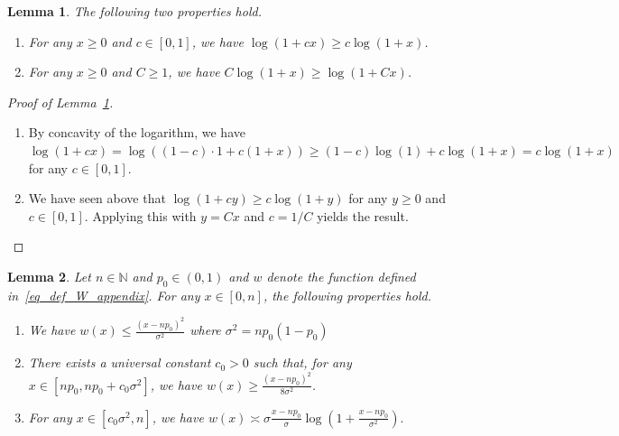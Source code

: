 \documentclass{article}
\newtheorem{lemma}{Lemma}
\begin{document}
\begin{lemma}\label{lem_logk_constants}
    The following two properties hold.
    \begin{enumerate}
        \item[(i)] For any $x \geq 0$ and $c \in [0,1]$, we have $\log(1+cx) \geq c\log(1+x)$.
        \item[(ii)] For any $x \geq 0$ and $C\geq 1$, we have $C\log(1+x) \geq \log(1+Cx)$.
    \end{enumerate}
\end{lemma}

\begin{proof}[Proof of Lemma~\ref{lem_logk_constants}]
\begin{enumerate}
    \item[(i)] By concavity of the logarithm, we have $\log(1+cx) = \log\left((1-c)\cdot 1 + c(1+x)\right) \geq (1-c) \log(1) + c\log(1+x) = c \log(1+x)$ for any $c \in [0,1]$. 
    \item[(ii)] We have seen above that $\log(1+cy) \geq c \log(1+y)$ for any $y \geq 0$ and $c \in [0,1]$. 
Applying this with $y = Cx$ and $c = 1/C$ yields the result. 
\end{enumerate}

    
\end{proof}


\begin{lemma}\label{lem_w_quadratic}
    Let $n\in \mathbb N$ and $p_0 \in (0,1)$ and $w$ denote the function defined in~\eqref{eq_def_W_appendix}. For any $x \in [0,n]$, the following properties hold.
    \begin{enumerate}
        \item We have $w(x) \leq \frac{(x-np_0)^2}{ \sigma^2}$ where $\sigma^2 = np_0(1-p_0)$
        \item There exists a universal constant $c_0>0$ such that, for any $x \in [np_0, np_0 + c_0\sigma^2]$, we have $w(x) \geq \frac{(x-np_0)^2}{8 \sigma^2}$.
        \item For any $x \in [c_0 \sigma^2, n]$, we have $w(x) \asymp \sigma \frac{x-np_0}{\sigma} \log\left(1+ \frac{x-np_0}{\sigma^2}\right).$
    \end{enumerate}
\end{lemma}
\end{document}
